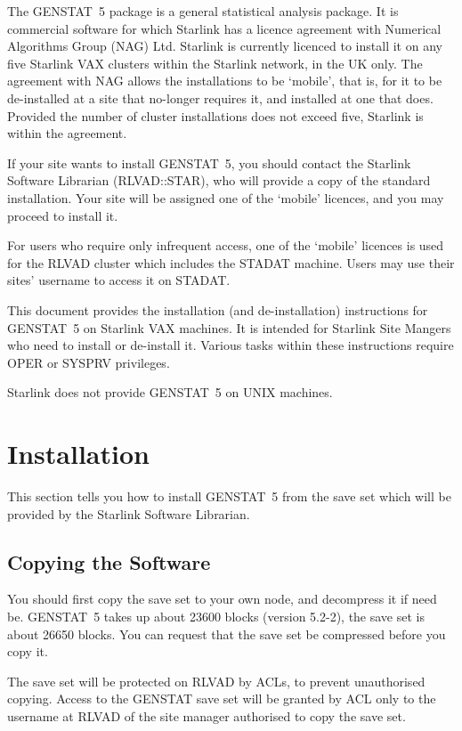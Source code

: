 The GENSTAT~5 package is a general statistical analysis package. It is
commercial software for which Starlink has a licence agreement with Numerical
Algorithms Group (NAG) Ltd. Starlink is currently licenced to install it on any
five Starlink VAX clusters within the Starlink network, in the UK only. The
agreement with NAG allows the installations to be `mobile', that is, for it to
be de-installed at a site that no-longer requires it, and installed at one that
does. Provided the number of cluster installations does not exceed five,
Starlink is within the agreement.

If your site wants to install GENSTAT~5, you should contact the Starlink
Software Librarian (RLVAD::STAR), who will provide a copy of the standard
installation. Your site will be assigned one of the `mobile' licences, and you
may proceed to install it.

For users who require only infrequent access, one of the `mobile' licences is
used for the RLVAD cluster which includes the STADAT machine. Users  may use
their sites' username to access it on STADAT.

This document provides the installation (and de-installation) instructions for
GENSTAT~5 on Starlink VAX machines. It is intended for Starlink Site Mangers
who need to install or de-install it. Various tasks within these instructions
require OPER or SYSPRV privileges.

Starlink does not provide GENSTAT~5 on UNIX machines.

\section{Installation}

This section tells you how to install GENSTAT~5 from the save set which will be
provided by the Starlink Software Librarian.

\subsection{Copying the Software}

You should first copy the save set to your own node, and decompress it if need
be. GENSTAT~5 takes up about 23600 blocks (version 5.2-2), the save set is
about 26650 blocks. You can request that the save set be compressed before you
copy it.

The save set will be protected on RLVAD by ACLs, to prevent unauthorised
copying. Access to the GENSTAT save set will be granted by ACL only to the
username at RLVAD of the site manager authorised to copy the save set.

